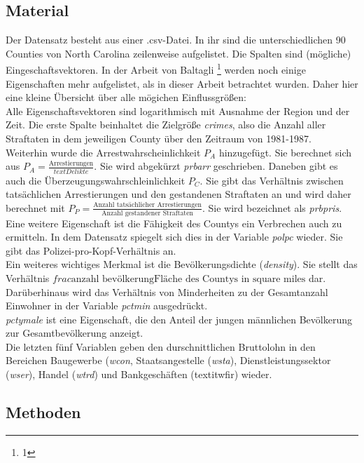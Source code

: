 \subsection{Material}
Der Datensatz besteht aus einer .csv-Datei.
In ihr sind die unterschiedlichen 90 Counties von North Carolina zeilenweise aufgelistet.
Die Spalten sind (m\"ogliche) Eingeschaftsvektoren.
In der Arbeit von Baltagli \footnote{1} werden noch einige Eigenschaften mehr aufgelistet, als in dieser Arbeit betrachtet wurden. Daher hier eine kleine \"Ubersicht über alle m\"ogichen Einflussgr\"o\ss{}en: \\
Alle Eigenschaftsvektoren sind logarithmisch mit Ausnahme der Region und der Zeit.
Die erste Spalte beinhaltet die Zielgr\"o\ss{}e \textit{crimes}, also die Anzahl aller Straftaten in dem jeweiligen County \"uber den Zeitraum von 1981-1987. \\
Weiterhin wurde die Arrestwahrscheinlichkeit $P_A$ hinzugef\"ugt. Sie berechnet sich aus $P_A = \frac{\text{Arrestierungen}}{text{Delikte}}$. Sie wird abgek\"urzt \textit{prbarr} geschrieben.
Daneben gibt es auch die \"Uberzeugungswahrschleinlichkeit $P_C$. Sie gibt das Verh\"altnis zwischen tats\"achlichen Arrestierungen und den gestandenen Straftaten an und wird daher berechnet mit $P_P = \frac{\text{Anzahl tats\"achlicher Arrestierungen}}{\text{Anzahl gestandener Straftaten}}$. Sie wird bezeichnet als \textit{prbpris}. \\
Eine weitere Eigenschaft ist die Fähigkeit des Countys ein Verbrechen auch zu ermitteln. In dem Datensatz spiegelt sich dies in der Variable \textit{polpc} wieder. Sie gibt das Polizei-pro-Kopf-Verhältnis an. \\
Ein weiteres wichtiges Merkmal ist die Bev\"olkerungsdichte (\textit{density}). Sie stellt das Verhältnis $frac{\text{anzahl bev\"olkerung}}{\text{Fl\"ache des Countys in square miles}}$ dar. \\
Darüberhinaus wird das Verh\"altnis von Minderheiten zu der Gesamtanzahl Einwohner in der Variable \textit{pctmin} ausgedrückt. \\
\textit{pctymale} ist eine Eigenschaft, die den Anteil der jungen m\"annlichen Bev\"olkerung zur Gesamtbev\"olkerung anzeigt. \\
Die letzten f\"unf Variablen geben den durschnittlichen Bruttolohn in den Bereichen Baugewerbe (\textit{wcon}, Staatsangestelle (\textit{wsta}), Dienstleistungssektor (\textit{wser}), Handel (\textit{wtrd}) und Bankgesch\"aften (textit{wfir}) wieder. \\


\subsection{Methoden}



